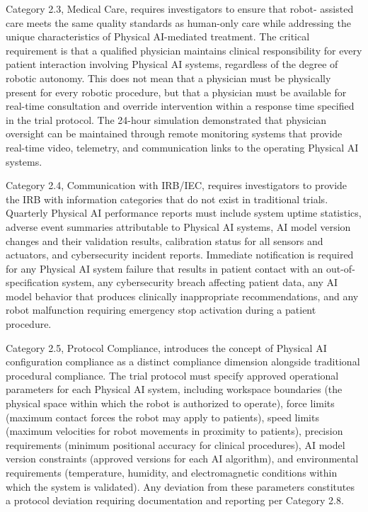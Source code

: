 Category 2.3, Medical Care, requires investigators to ensure that robot-
assisted care meets the same quality standards as human-only care while
addressing the unique characteristics of Physical AI-mediated treatment.
The critical requirement is that a qualified physician maintains clinical
responsibility for every patient interaction involving Physical AI systems,
regardless of the degree of robotic autonomy. This does not mean that a
physician must be physically present for every robotic procedure, but that
a physician must be available for real-time consultation and override
intervention within a response time specified in the trial protocol. The
24-hour simulation \cite{site-docs} demonstrated that physician oversight
can be maintained through remote monitoring systems that provide real-time
video, telemetry, and communication links to the operating Physical AI
systems.

Category 2.4, Communication with IRB/IEC, requires investigators to provide
the IRB with information categories that do not exist in traditional trials.
Quarterly Physical AI performance reports must include system uptime
statistics, adverse event summaries attributable to Physical AI systems, AI
model version changes and their validation results, calibration status for
all sensors and actuators, and cybersecurity incident reports. Immediate
notification is required for any Physical AI system failure that results in
patient contact with an out-of-specification system, any cybersecurity
breach affecting patient data, any AI model behavior that produces
clinically inappropriate recommendations, and any robot malfunction
requiring emergency stop activation during a patient procedure.

Category 2.5, Protocol Compliance, introduces the concept of Physical AI
configuration compliance as a distinct compliance dimension alongside
traditional procedural compliance. The trial protocol must specify approved
operational parameters for each Physical AI system, including workspace
boundaries (the physical space within which the robot is authorized to
operate), force limits (maximum contact forces the robot may apply to
patients), speed limits (maximum velocities for robot movements in proximity
to patients), precision requirements (minimum positional accuracy for
clinical procedures), AI model version constraints (approved versions for
each AI algorithm), and environmental requirements (temperature, humidity,
and electromagnetic conditions within which the system is validated). Any
deviation from these parameters constitutes a protocol deviation requiring
documentation and reporting per Category 2.8.

